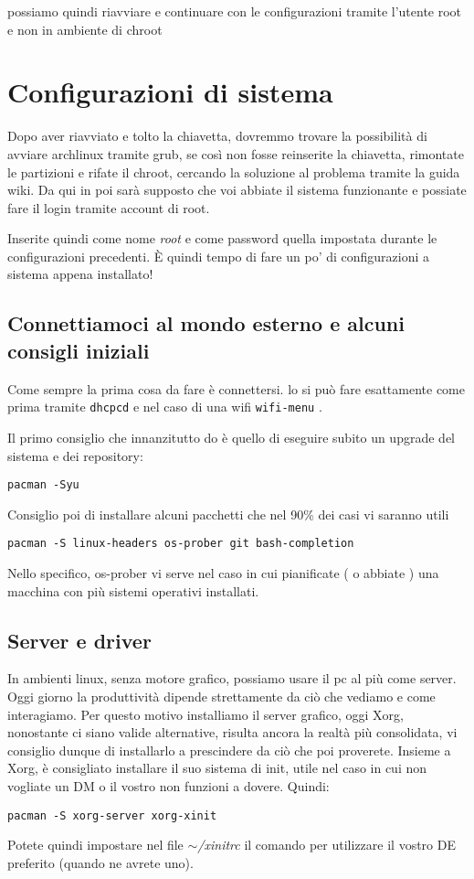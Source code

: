\documentclass[twoside,italian]{book}
\newcommand{\centcode}[1]{
	
	\definecolor{centcode}{rgb}{0.5,0.1,0.1}
	
	\begin{center}
	 	\texttt{\textcolor{centcode}{#1}}
	\end{center}
	
	
}
\newcommand{\code}[1]{
	\texttt{\textcolor{code}{#1}}
}
\begin{document}
			possiamo quindi riavviare e continuare con le configurazioni tramite l'utente root e non in ambiente di chroot

	\chapter{Configurazioni di sistema}

		Dopo aver riavviato e tolto la chiavetta, dovremmo trovare la possibilità di avviare archlinux tramite grub, se così non fosse reinserite la chiavetta, rimontate le partizioni e rifate il chroot, cercando la soluzione al problema tramite la guida wiki.
		Da qui in poi sarà supposto che voi abbiate il sistema funzionante e possiate fare il login tramite account di root.

		Inserite quindi come nome \textit{root} e come password quella impostata durante le configurazioni precedenti. È quindi tempo di fare un po' di configurazioni a sistema appena installato!

		\section{Connettiamoci al mondo esterno e alcuni consigli iniziali}

			Come sempre la prima cosa da fare è connettersi. lo si può fare esattamente come prima tramite \code{dhcpcd} e nel caso di una wifi \code{wifi-menu}.

			Il primo consiglio che innanzitutto do è quello di eseguire subito un upgrade del sistema e dei repository:\centcode{pacman -Syu}
			Consiglio poi di installare alcuni pacchetti che nel 90\% dei casi vi saranno utili\centcode{pacman -S linux-headers os-prober git bash-completion}Nello specifico, os-prober vi serve nel caso in cui pianificate ( o abbiate ) una macchina con più sistemi operativi installati.

		\section{Server e driver}

			In ambienti linux, senza motore grafico, possiamo usare il pc al più come server. Oggi giorno la produttività dipende strettamente da ciò che vediamo e come interagiamo. Per questo motivo installiamo il server grafico, oggi Xorg, nonostante ci siano valide alternative, risulta ancora la realtà più consolidata, vi consiglio dunque di installarlo a prescindere da ciò che poi proverete. Insieme a Xorg, è consigliato installare il suo sistema di init, utile nel caso in cui non vogliate un DM o il vostro non funzioni a dovere. Quindi:\centcode{pacman -S xorg-server xorg-xinit}
			Potete quindi impostare nel file \textit{$\sim$/xinitrc} il comando per utilizzare  il vostro DE preferito (quando ne avrete uno).
\end{document}
